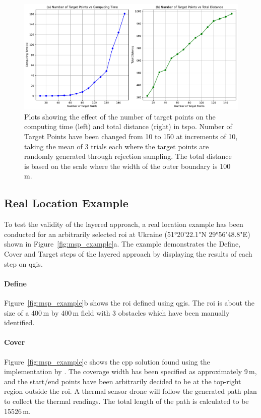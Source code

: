 \begin{figure}[h!]
    \centering
    \includegraphics[width=\linewidth]{figs/Jihwan/target_points_vs.pdf}
    \caption[Effect of Number of Target Points on Computing Time and Total Distance of TSP-O Solution]
    {Plots showing the effect of the number of target points on the computing time (left) and total distance (right) in \gls{tspo}. Number of Target Points have been changed from 10 to 150 at increments of 10, taking the mean of 3 trials each where the target points are randomly generated through rejection sampling. The total distance is based on the scale where the width of the outer boundary is 100\,m.}
    \label{fig:msp_tspo_plot}
\end{figure}

\subsection{Real Location Example}
\label{sec:msp_example}

To test the validity of the layered approach, a real location example has been conducted for an arbitrarily selected \gls{roi} at Ukraine (51°20'22.1"N 29°56'48.8"E) shown in Figure~\ref{fig:msp_example}a. The example demonstrates the Define, Cover and Target steps of the layered approach by displaying the results of each step on \gls{qgis}. 

\paragraph{Define} Figure~\ref{fig:msp_example}b shows the \gls{roi} defined using \gls{qgis}. The \gls{roi} is about the size of a 400\,m by 400\,m field with 3 obstacles which have been manually identified.  

\paragraph{Cover} Figure~\ref{fig:msp_example}c shows the \gls{cpp} solution found using the implementation by \cite{bahnemann2021cpp}. The coverage width has been specified as approximately 9\,m, and the start/end points have been arbitrarily decided to be at the top-right region outside the \gls{roi}. A thermal sensor drone will follow the generated path plan to collect the thermal readings. The total length of the path is calculated to be 15526\,m.

